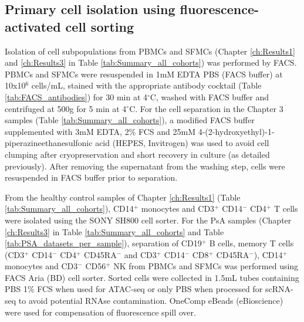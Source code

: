 \subsection{Primary cell isolation using fluorescence-activated cell sorting}
Isolation of cell subpopulations from PBMCs and SFMCs (Chapter \ref{ch:Results1} and \ref{ch:Results3} in Table \ref{tab:Summary_all_cohorts}) was performed by FACS. PBMCs and SFMCs were resuspended in 1mM EDTA PBS (FACS buffer) at 10x10$^6$ cells/mL, stained with the appropriate antibody cocktail (Table \ref{tab:FACS_antibodies}) for 30 min at 4{$^\circ$}C, washed with FACS buffer and centrifuged at 500g for 5 min at 4{$^\circ$}C. For the cell separation in the Chapter 3 samples (Table \ref{tab:Summary_all_cohorts}), a modified FACS buffer supplemented with 3mM EDTA, 2\% FCS and 25mM 4-(2-hydroxyethyl)-1-piperazineethanesulfonic acid (HEPES, Invitrogen) was used to avoid cell clumping after cryopreservation and short recovery in culture (as detailed previously). After removing the supernatant from the washing step, cells were resuspended in FACS buffer prior to separation. 

From the healthy control samples of Chapter \ref{ch:Results1} (Table \ref{tab:Summary_all_cohorts}), CD14$^{+}$ monocytes and CD3$^+$ CD14$^{-}$ CD4$^{+}$ T cells were isolated using the SONY SH800 cell sorter. For the PsA samples (Chapter \ref{ch:Results3} in Table \ref{tab:Summary_all_cohorts} and Table \ref{tab:PSA_datasets_per_sample}), separation of CD19$^+$ B cells, memory T cells (CD3$^+$ CD14$^-$ CD4$^+$ CD45RA$^{-}$ and CD3$^+$ CD14$^-$ CD8$^+$ CD45RA$^-$), CD14$^+$ monocytes and CD3$^-$ CD56$^+$ NK from PBMCs and SFMCs was performed using FACS Aria (BD) cell sorter. Sorted cells were collected in 1.5mL tubes containing PBS 1\% FCS when used for ATAC-seq or only PBS when processed for scRNA-seq to avoid potential RNAse contamination. OneComp eBeads (eBioscience) were used for compensation of fluorescence spill over.



